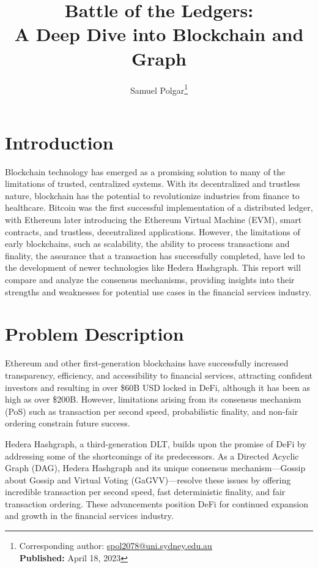 \documentclass[
	a4paper, %
	10pt, %
	unnumberedsections, %
	twoside, %
]{LTJournalArticle}
\title{Battle of the Ledgers: \\ A Deep Dive into Blockchain and Graph} %
\author{%
	Samuel Polgar\thanks{Corresponding author: \href{mailto:spol2078@uni.sydney.edu.au}{spol2078@uni.sydney.edu.au}\\ \textbf{Published:} April 18, 2023}
}
\begin{document}
\maketitle %


\section{Introduction}

Blockchain technology has emerged as a promising solution to many of the limitations of trusted, centralized systems. With its decentralized and trustless nature, blockchain has the potential to revolutionize industries from finance to healthcare. Bitcoin was the first successful implementation of a distributed ledger, with Ethereum later introducing the Ethereum Virtual Machine (EVM), smart contracts, and trustless, decentralized applications. However, the limitations of early blockchains, such as scalability, the ability to process transactions and finality, the assurance that a transaction has successfully completed, have led to the development of newer technologies like Hedera Hashgraph. This report will compare and analyze the consensus mechanisms, providing insights into their strengths and weaknesses for potential use cases in the financial services industry.



\section{Problem Description}

Ethereum and other first-generation blockchains have successfully increased transparency, efficiency, and accessibility to financial services, attracting confident investors and resulting in over \$60B USD locked in DeFi, although it has been as high as over \$200B. However, limitations arising from its consensus mechanism (PoS) such as transaction per second speed, probabilistic finality, and non-fair ordering constrain future success.

Hedera Hashgraph, a third-generation DLT, builds upon the promise of DeFi by addressing some of the shortcomings of its predecessors. As a Directed Acyclic Graph (DAG), Hedera Hashgraph and its unique consensus mechanism—Gossip about Gossip and Virtual Voting (GaGVV)—resolve these issues by offering incredible transaction per second speed, fast deterministic finality, and fair transaction ordering. These advancements position DeFi for continued expansion and growth in the financial services industry.
\end{document}
